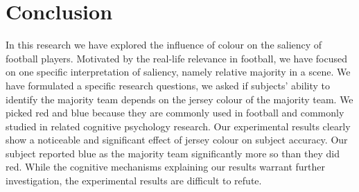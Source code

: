 \section{Conclusion}\label{s:conclusion}

In this research we have explored the influence of colour on the saliency of football players. Motivated by the real-life relevance in football, we have focused on one specific interpretation of saliency, namely relative majority in a scene. We have formulated a specific research questions, we asked if subjects' ability to identify the majority team depends on the jersey colour of the majority team. We picked red and blue because they are commonly used in football and commonly studied in related cognitive psychology research. Our experimental results clearly show a noticeable and significant effect of jersey colour on subject accuracy. Our subject reported blue as the majority team significantly more so than they did red. While the cognitive mechanisms explaining our results warrant further investigation, the experimental results are difficult to refute.